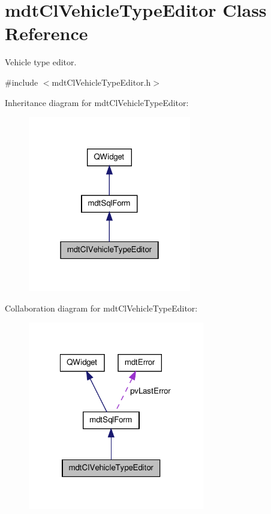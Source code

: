 \hypertarget{classmdt_cl_vehicle_type_editor}{\section{mdt\-Cl\-Vehicle\-Type\-Editor Class Reference}
\label{classmdt_cl_vehicle_type_editor}
}


Vehicle type editor.  




{\ttfamily \#include $<$mdt\-Cl\-Vehicle\-Type\-Editor.\-h$>$}



Inheritance diagram for mdt\-Cl\-Vehicle\-Type\-Editor\-:
\nopagebreak
\begin{figure}[H]
\begin{center}
\leavevmode
\includegraphics[width=202pt]{classmdt_cl_vehicle_type_editor__inherit__graph}
\end{center}
\end{figure}


Collaboration diagram for mdt\-Cl\-Vehicle\-Type\-Editor\-:
\nopagebreak
\begin{figure}[H]
\begin{center}
\leavevmode
\includegraphics[width=218pt]{classmdt_cl_vehicle_type_editor__coll__graph}
\end{center}
\end{figure}
